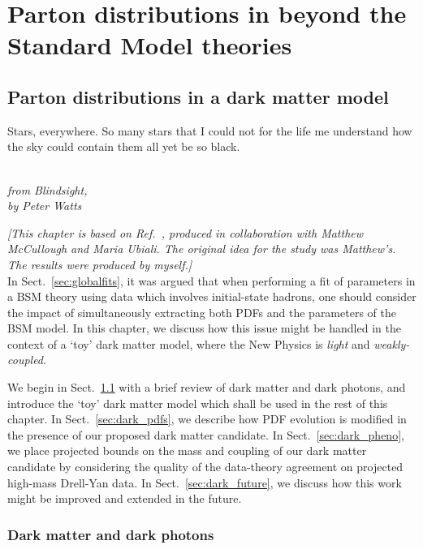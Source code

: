 \documentclass[withindex,glossary]{cam-thesis}
\begin{document}
\newpage
\part{Parton distributions in beyond the Standard Model theories}
\chapter{Parton distributions in a dark matter model}
\label{chap:darkphoton}

\epigraph{Stars, everywhere. So many stars that I could not for the life me understand how the sky could contain them all yet be so black.}{\textit{\\ from Blindsight, \\ by Peter Watts}}

\noindent \textit{[This chapter is based on Ref.~\cite{McCullough:2022hzr}, produced in collaboration with Matthew McCullough and Maria Ubiali. The original idea for the study was Matthew's. The results were produced by myself.]}\\

\noindent In Sect.~\ref{sec:globalfits}, it was argued that when performing a fit of parameters in a BSM theory using data which involves initial-state hadrons, one should consider the impact of simultaneously extracting both PDFs and the parameters of the BSM model. In this chapter, we discuss how this issue might be handled in the context of a `toy' dark matter model, where the New Physics is \textit{light} and \textit{weakly-coupled}.

We begin in Sect.~\ref{sec:darkphoton} with a brief review of dark matter and dark photons, and introduce the `toy' dark matter model which shall be used in the rest of this chapter. In Sect.~\ref{sec:dark_pdfs}, we describe how PDF evolution is modified in the presence of our proposed dark matter candidate. In Sect.~\ref{sec:dark_pheno}, we place projected bounds on the mass and coupling of our dark matter candidate by considering the quality of the data-theory agreement on projected high-mass Drell-Yan data. In Sect.~\ref{sec:dark_future}, we discuss how this work might be improved and extended in the future.


\section{Dark matter and dark photons}
\label{sec:darkphoton}
\end{document}
